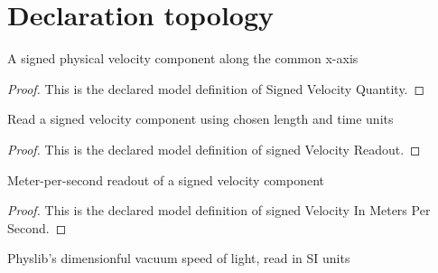 \section{Declaration topology}
\begin{definition}
  \label{def:physics:phyx-mini-0590:phyxminiproblems-problemphyxmini0590-signedvelocityquantity}
  A signed physical velocity component along the common x-axis
\end{definition}
\begin{proof}
  This is the declared model definition of Signed Velocity Quantity.
\end{proof}
\begin{definition}
  \label{def:physics:phyx-mini-0590:phyxminiproblems-problemphyxmini0590-signedvelocityreadout}
  Read a signed velocity component using chosen length and time units
\end{definition}
\begin{proof}
  This is the declared model definition of signed Velocity Readout.
\end{proof}
\begin{definition}
  \label{def:physics:phyx-mini-0590:phyxminiproblems-problemphyxmini0590-signedvelocityinmeterspersecond}
  Meter-per-second readout of a signed velocity component
\end{definition}
\begin{proof}
  This is the declared model definition of signed Velocity In Meters Per Second.
\end{proof}
\begin{definition}
  \label{def:physics:phyx-mini-0590:phyxminiproblems-problemphyxmini0590-vacuumlightspeedinmeterspersecond}
  Physlib's dimensionful vacuum speed of light, read in SI units
\end{definition}
